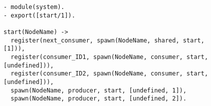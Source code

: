 \begin{figure}[h!]
\begin{lstlisting}[style=erlangcode, caption=The Erlang module \code{system}, label=fig:structsystem]
- module(system).
- export([start/1]).

start(NodeName) -> 
  register(next_consumer, spawn(NodeName, shared, start, [1])),
  register(consumer_ID1, spawn(NodeName, consumer, start, [undefined])),
  register(consumer_ID2, spawn(NodeName, consumer, start, [undefined])),
  spawn(NodeName, producer, start, [undefined, 1]),
  spawn(NodeName, producer, start, [undefined, 2]).
\end{lstlisting}
\end{figure}


